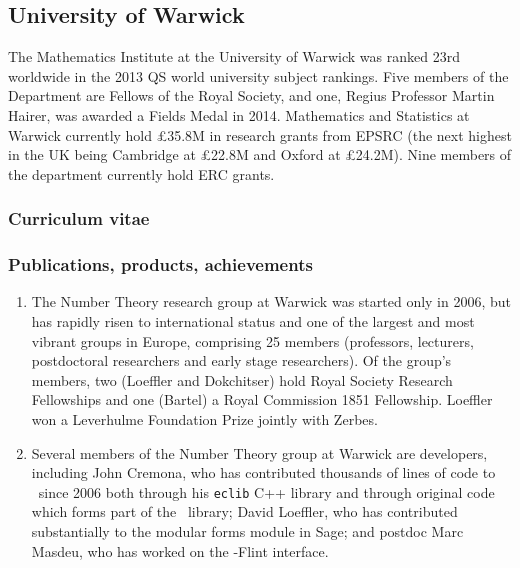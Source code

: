 \subsection*{University of Warwick}


The Mathematics Institute at the University of Warwick was ranked 23rd
worldwide in the 2013 QS world university subject rankings.  Five
members of the Department are Fellows of the Royal Society, and one,
Regius Professor Martin Hairer, was awarded a Fields Medal in 2014.
Mathematics and Statistics at Warwick currently hold £35.8M in
research grants from EPSRC (the next highest in the UK being Cambridge
at £22.8M and Oxford at £24.2M).  Nine members of the department
currently hold ERC grants.



\subsubsection*{Curriculum vitae}




%
%
%

\subsubsection*{Publications, products, achievements}
\begin{enumerate}
\item
The Number Theory research group at Warwick was started only in 2006,
but has rapidly risen to international status and one of the largest
and most vibrant groups in Europe, comprising 25 members (professors,
lecturers, postdoctoral researchers and early stage researchers).  Of
the group's members, two (Loeffler and Dokchitser) hold Royal Society
Research Fellowships and one (Bartel) a Royal Commission 1851
Fellowship.  Loeffler won a Leverhulme Foundation Prize jointly with
Zerbes.
\item
Several members of the Number Theory group at Warwick are \Sage
developers, including John Cremona, who has contributed thousands of
lines of code to \Sage\ since 2006 both through his {\tt eclib} C++
library and through original \Python code which forms part of the
\Sage\ library; David Loeffler, who has contributed substantially to
the modular forms module in Sage; and postdoc Marc Masdeu, who has
worked on the \Sage-Flint interface.
\end{enumerate}

